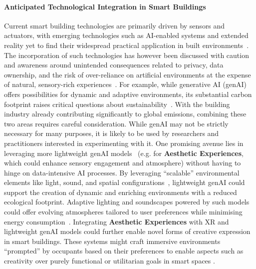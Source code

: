 \paragraph{Anticipated Technological Integration in Smart Buildings} Current smart building technologies are primarily driven by sensors and actuators, with emerging technologies such as AI-enabled systems and extended reality yet to find their widespread practical application in built environments~\cite{moreno2024generative}. The incorporation of such technologies has however been discussed with caution and awareness around unintended consequences related to privacy, data ownership, and the risk of over-reliance on artificial environments at the expense of natural, sensory-rich experiences~\cite{moreno2024generative}. For example, while generative AI (genAI) offers possibilities for dynamic and adaptive environments, its substantial carbon footprint raises critical questions about sustainability~\cite{chien2023reducing}. With the building industry already contributing significantly to global emissions, combining these two areas requires careful consideration. While genAI may not be strictly necessary for many purposes, it is likely to be used by researchers and practitioners interested in experimenting with it. One promising avenue lies in leveraging more lightweight genAI models~\cite{mei2023lightlm} (e.g. for \textbf{Aesthetic Experiences}, which could enhance sensory engagement and atmosphere) without having to hinge on data-intensive AI processes. By leveraging ``scalable'' environmental elements like light, sound, and spatial configurations~\cite{deng2019diffusive, ishiguro2014ubisonus}, lightweight genAI could support the creation of dynamic and enriching environments with a reduced ecological footprint. Adaptive lighting and soundscapes powered by such models could offer evolving atmospheres tailored to user preferences while minimising energy consumption~\cite{zhao2017mediated}. Integrating \textbf{Aesthetic Experiences} with XR and lightweight genAI models could further enable novel forms of creative expression in smart buildings. These systems might craft immersive environments ``prompted'' by occupants based on their preferences to enable aspects such as creativity over purely functional or utilitarian goals in smart spaces \cite{ccetin2024learning}.

